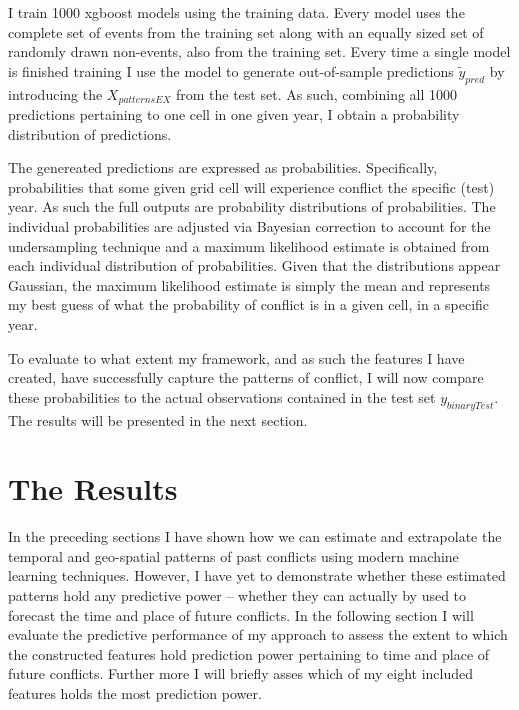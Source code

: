 \documentclass[a4paper]{article}
\begin{document}
I train 1000 xgboost models using the training data. Every model uses the complete set of events from the training set along with an equally sized set of randomly drawn non-events, also from the training set. Every time a single model is finished training I use the model to generate out-of-sample predictions $\tilde{y}_{pred}$ by introducing the $X_{patternsEX}$ from the test set. As such, combining all 1000 predictions pertaining to one cell in one given year, I obtain a probability distribution of predictions. \par


The genereated predictions are expressed as probabilities. Specifically, probabilities that some given grid cell will experience conflict the specific (test) year. As such the full outputs are probability distributions of probabilities. The individual probabilities are adjusted via Bayesian correction to account for the undersampling technique and a maximum likelihood estimate is obtained from each individual distribution of probabilities. Given that the distributions appear Gaussian, the maximum likelihood estimate is simply the mean and represents my best guess of what the probability of conflict is in a given cell, in a specific year.\par 


To evaluate to what extent my framework, and as such the features I have created, have successfully capture the patterns of conflict, I will now compare these probabilities to the actual observations contained in the test set $y_{binaryTest}$. The results will be presented in the next section.\par

\section{The Results}

In the preceding sections I have shown how we can estimate and extrapolate the temporal and geo-spatial patterns of past conflicts using modern machine learning techniques. However, I have yet to demonstrate whether these estimated patterns hold any predictive power -- whether they can actually by used to forecast the time and place of future conflicts. In the following section I will evaluate the predictive performance of my approach to assess the extent to which the constructed features hold prediction power pertaining to time and place of future conflicts. Further more I will briefly asses which of my eight included features holds the most prediction power.\par 
\end{document}
